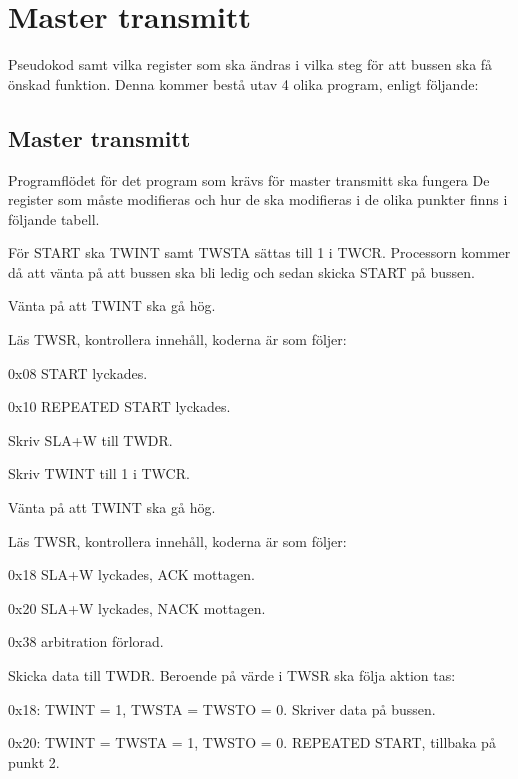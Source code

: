 
\section{Master transmitt}
\label{bussbilaga}
Pseudokod samt vilka register som ska ändras i vilka steg för att bussen ska få önskad funktion. Denna kommer bestå utav 4 olika program, enligt följande:

\subsection{Master transmitt}
Programflödet för det program som krävs för master transmitt ska fungera De register som måste modifieras och hur de ska modifieras i de olika punkter finns i följande tabell.

\begin{packed_enumerate}
\item För START ska TWINT samt TWSTA sättas till 1 i TWCR. Processorn kommer då att vänta på att bussen ska bli ledig och sedan skicka START på bussen.
\item Vänta på att TWINT ska gå hög.
\item Läs TWSR, kontrollera innehåll, koderna är som följer:
\begin{packed_enumerate}
\item 0x08 START lyckades.
\item 0x10 REPEATED START lyckades.
\end{packed_enumerate}
\item Skriv SLA+W till TWDR.
\item Skriv TWINT till 1 i TWCR.
\item Vänta på att TWINT ska gå hög.
\item Läs TWSR, kontrollera innehåll, koderna är som följer:
\begin{packed_enumerate}
\item 0x18 SLA+W lyckades, ACK mottagen.
\item 0x20 SLA+W lyckades, NACK mottagen.
\item 0x38 arbitration förlorad.
\end{packed_enumerate}
\item Skicka data till TWDR. Beroende på värde i TWSR ska följa aktion tas:
\begin{packed_enumerate}
\item 0x18: TWINT = 1, TWSTA = TWSTO = 0. Skriver data på bussen.
\item 0x20: TWINT = TWSTA = 1, TWSTO = 0. REPEATED START, tillbaka på punkt 2.

\end{packed_enumerate}
\end{packed_enumerate}
